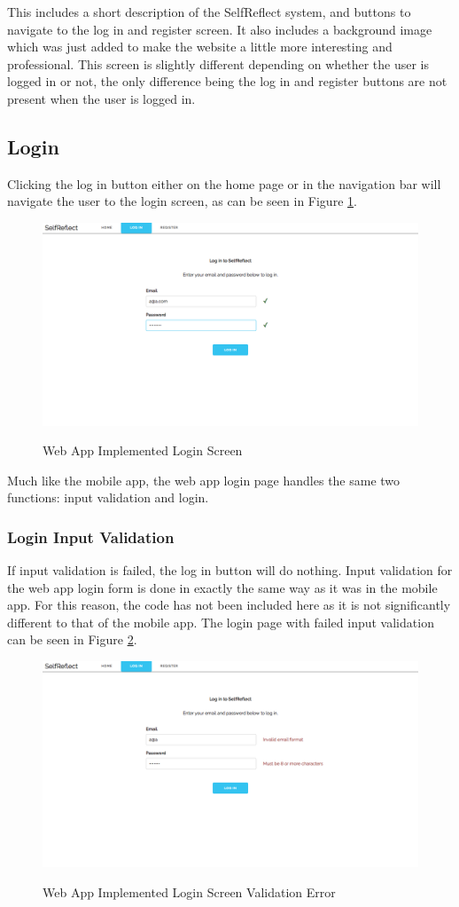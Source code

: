 \documentclass[11pt,openright,a4paper]{report}
\begin{document}
This includes a short description of the SelfReflect system, and buttons to navigate to the log in and register screen. It also includes a background image which was just added to make the website a little more interesting and professional. This screen is slightly different depending on whether the user is logged in or not, the only difference being the log in and register buttons are not present when the user is logged in.

\subsection{Login}
Clicking the log in button either on the home page or in the navigation bar will navigate the user to the login screen, as can be seen in Figure \ref{fig:webloginimpl}.

\begin{figure}[ht]
\centering
\caption{Web App Implemented Login Screen}
\includegraphics[width=.8\textwidth]{i/webloginimpl.png}
\label{fig:webloginimpl}
\end{figure}

Much like the mobile app, the web app login page handles the same two functions: input validation and login.

\subsubsection{Login Input Validation}
If input validation is failed, the log in button will do nothing. Input validation for the web app login form is done in exactly the same way as it was in the mobile app. For this reason, the code has not been included here as it is not significantly different to that of the mobile app. The login page with failed input validation can be seen in Figure \ref{fig:webloginerror}.

\begin{figure}[ht]
\centering
\caption{Web App Implemented Login Screen Validation Error}
\includegraphics[width=.8\textwidth]{i/webloginerror.png}
\label{fig:webloginerror}
\end{figure}
\end{document}
